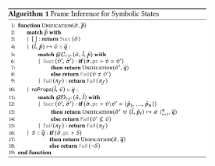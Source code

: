 
\begin{figure}
\includegraphics[width=0.47\textwidth]{figures/algorithm.png}
\vspace*{-0.5cm}
\end{figure}

